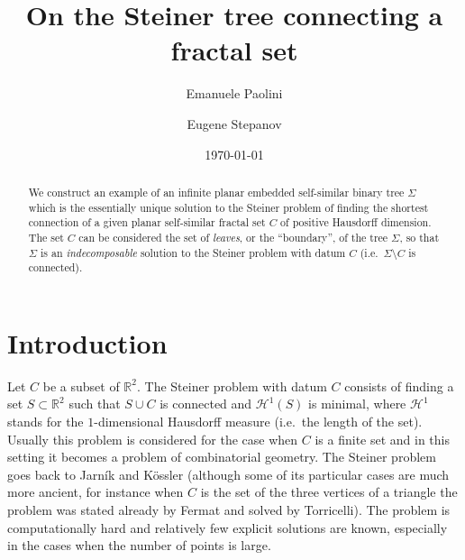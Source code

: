 \documentclass{amsart}
\author[Paolini]{Emanuele Paolini}
\author[Stepanov]{Eugene Stepanov}
\date{\today}
\title{On the Steiner tree connecting a fractal set}
\newcommand{\RR}{\mathbb R}
\renewcommand{\H}{\mathcal H}
\renewcommand{\H}{\mathcal{H}}
\theoremstyle{definition}
\theoremstyle{remark}
\begin{document}
\begin{abstract}
We construct an example of an infinite planar embedded self-similar binary tree  
$\Sigma$ which is the essentially unique solution to the Steiner problem of finding 
the shortest connection of a given planar self-similar fractal set $C$
of positive Hausdorff dimension.
The set $C$ can be considered the set of \emph{leaves}, or the ``boundary'',
of the tree $\Sigma$,
so that $\Sigma$ is an \emph{indecomposable} solution to the Steiner problem
with datum $C$ (i.e.\ $\Sigma\setminus C$ is connected).
\end{abstract}

\maketitle

\section{Introduction}

Let $C$ be a subset of $\RR^2$.
The Steiner problem with datum $C$ consists of finding a set $S\subset \RR^2$ 
such that $S\cup C$ is connected and $\H^1(S)$ is minimal, where $\H^1$ stands 
for the $1$-dimensional Hausdorff measure (i.e.\ the length of the set).
Usually this problem is considered for the case when $C$ is a finite 
set and in this setting it becomes a problem of combinatorial geometry. 
The Steiner problem goes back to Jarník and Kössler \cite{JarKos34} 
(although some of its particular cases are much more ancient, for instance 
when $C$ is the set of the three vertices of a triangle the problem was 
stated already by Fermat and solved by Torricelli).
The problem is computationally hard and relatively few explicit solutions 
are known, especially in the cases when the number of points is large.
\end{document}
